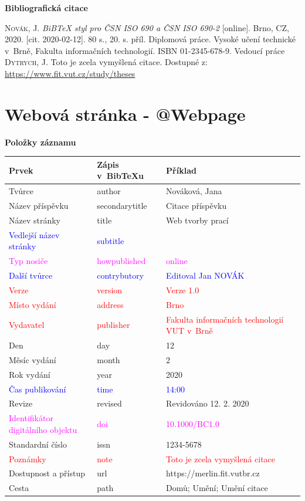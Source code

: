 \bigskip

\noindent \textbf{Bibliografická citace}

\medskip

\noindent \textsc{Novák}, J. \textit{BiBTeX styl pro ČSN ISO 690 a ČSN ISO 690-2} [online]. Brno, CZ, 2020. [cit. 2020-02-12]. 80 s., 20. s. příl. Diplomová práce. Vysoké učení technické v~Brně, Fakulta informačních technologií. ISBN 01-2345-678-9. Vedoucí práce \textsc{Dytrych}, J. Toto je zcela vymyšlená citace. Dostupné z: \url{https://www.fit.vut.cz/study/theses}
\newpage
\section*{Webová stránka - @Webpage}
\label{pr-webpage}
\noindent \textbf{Položky záznamu}

\medskip

\begin{tabularx}{\linewidth}{X X X}
    Prvek & Zápis v~BibTeXu & Příklad\\\hline
    Tvůrce & author & Nováková, Jana\\
    Název příspěvku & secondarytitle & Citace příspěvku\\
    Název stránky & title & Web tvorby prací\\
    \textcolor{blue}{Vedlejší název stránky}  &  \textcolor{blue}{subtitle} & \\
    \textcolor{magenta}{Typ nosiče} & \textcolor{magenta}{howpublished} & \textcolor{magenta}{online}\\
    \textcolor{blue}{Další tvůrce} & \textcolor{blue}{contrybutory} & \textcolor{blue}{Editoval Jan NOVÁK}\\
    \textcolor{red}{Verze} & \textcolor{red}{version} & \textcolor{red}{Verze 1.0}\\
    \textcolor{red}{Místo vydání} & \textcolor{red}{address} & \textcolor{red}{Brno}\\
    \textcolor{red}{Vydavatel} & \textcolor{red}{publisher} & \textcolor{red}{Fakulta informačních technologií VUT v~Brně}\\
    Den & day & 12\\
    Měsíc vydání & month & 2\\
    Rok vydání & year & 2020\\
    \textcolor{blue}{Čas publikování} & \textcolor{blue}{time} & \textcolor{blue}{14:00}\\
    Revize & revised & Revidováno 12. 2. 2020\\
    \textcolor{magenta}{Identifikátor digitálního objektu} & \textcolor{magenta}{doi} & \textcolor{magenta}{10.1000/BC1.0}\\
    Standardní číslo & issn & 1234-5678\\
    \textcolor{red}{Poznámky} & \textcolor{red}{note} & \textcolor{red}{Toto je zcela vymyšlená citace}\\
    Dostupnost a přístup & url & https://merlin.fit.vutbr.cz\\
    Cesta & path & Domů; Umění; Umění citace
\end{tabularx}

